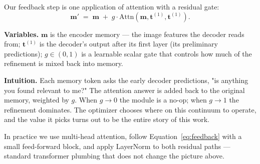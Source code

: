 Our feedback step is one application of attention with a residual gate:
\begin{equation}
    \mathbf{m}' \;=\; \mathbf{m} \;+\; g \cdot \mathrm{Attn}(\mathbf{m}, \mathbf{t}^{(1)}, \mathbf{t}^{(1)}).
    \label{eq:feedback}
\end{equation}

\noindent\textbf{Variables.} $\mathbf{m}$ is the encoder memory --- the image features the decoder reads from; $\mathbf{t}^{(1)}$ is the decoder's output after its first layer (its preliminary predictions); $g \in (0, 1)$ is a learnable scalar gate that controls how much of the refinement is mixed back into memory.

\noindent\textbf{Intuition.} Each memory token asks the early decoder predictions, "is anything you found relevant to me?" The attention answer is added back to the original memory, weighted by $g$. When $g \to 0$ the module is a no-op; when $g \to 1$ the refinement dominates. The optimizer chooses where on this continuum to operate, and the value it picks turns out to be the entire story of this work.

In practice we use multi-head attention, follow Equation~\ref{eq:feedback} with a small feed-forward block, and apply LayerNorm to both residual paths --- standard transformer plumbing that does not change the picture above.
